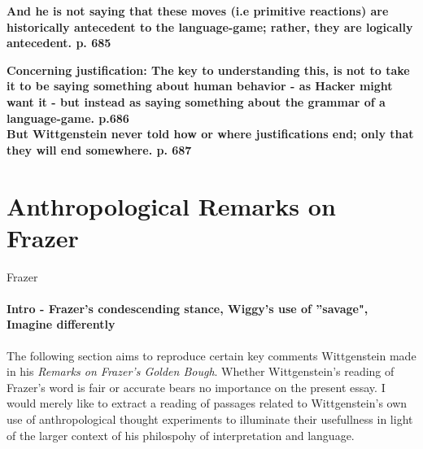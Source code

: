 \documentclass{article}
\begin{document}
\textbf{And he is not saying that these moves (i.e primitive reactions) are historically antecedent to the language-game; rather, they are logically antecedent. p. 685}

\textbf{Concerning justification: The key to understanding this, is not to take it to be saying something about human behavior - as Hacker might want it - but instead as saying something about the grammar of a language-game. p.686\\
But Wittgenstein never told how or where justifications end; only that they will end somewhere. p. 687}

\section{Anthropological Remarks on Frazer}
\hypertarget{sec3}{Frazer}
\paragraph{Intro - Frazer's condescending stance, Wiggy's use of ''savage", Imagine differently}
The following section aims to reproduce certain key comments Wittgenstein made in his \textit{Remarks on Frazer's Golden Bough}. Whether Wittgenstein's reading of Frazer's word is fair or accurate bears no importance on the present essay. I would merely like to extract a reading of passages related to Wittgenstein's own use of anthropological thought experiments to illuminate their usefullness in light of the larger context of his philospohy of interpretation and language. 
\end{document}

